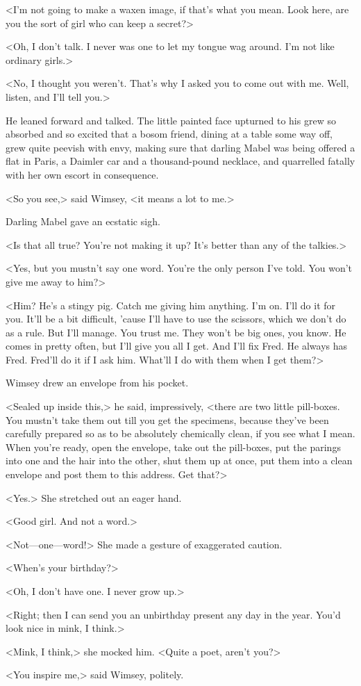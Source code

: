 <I'm not going to make a waxen image, if that's what you mean. Look here, are you the sort of girl who can keep a secret?>

<Oh, I don't talk. I never was one to let my tongue wag around. I'm not like ordinary girls.>

<No, I thought you weren't. That's why I asked you to come out with me. Well, listen, and I'll tell you.>

He leaned forward and talked. The little painted face upturned to his grew so absorbed and so excited that a bosom friend, dining at a table some way off, grew quite peevish with envy, making sure that darling Mabel was being offered a flat in Paris, a Daimler car and a thousand-pound necklace, and quarrelled fatally with her own escort in consequence.

<So you see,> said Wimsey, <it means a lot to me.>

Darling Mabel gave an ecstatic sigh.

<Is that all true? You're not making it up? It's better than any of the talkies.>

<Yes, but you mustn't say one word. You're the only person I've told. You won't give me away to him?>

<Him? He's a stingy pig. Catch me giving him anything. I'm on. I'll do it for you. It'll be a bit difficult, 'cause I'll have to use the scissors, which we don't do as a rule. But I'll manage. You trust me. They won't be big ones, you know. He comes in pretty often, but I'll give you all I get. And I'll fix Fred. He always has Fred. Fred'll do it if I ask him. What'll I do with them when I get them?>

Wimsey drew an envelope from his pocket.

<Sealed up inside this,> he said, impressively, <there are two little pill-boxes. You mustn't take them out till you get the specimens, because they've been carefully prepared so as to be absolutely chemically clean, if you see what I mean. When you're ready, open the envelope, take out the pill-boxes, put the parings into one and the hair into the other, shut them up at once, put them into a clean envelope and post them to this address. Get that?>

<Yes.> She stretched out an eager hand.

<Good girl. And not a word.>

<Not—one—word!> She made a gesture of exaggerated caution.

<When's your birthday?>

<Oh, I don't have one. I never grow up.>

<Right; then I can send you an unbirthday present any day in the year. You'd look nice in mink, I think.>

<Mink, I think,> she mocked him. <Quite a poet, aren't you?>

<You inspire me,> said Wimsey, politely.